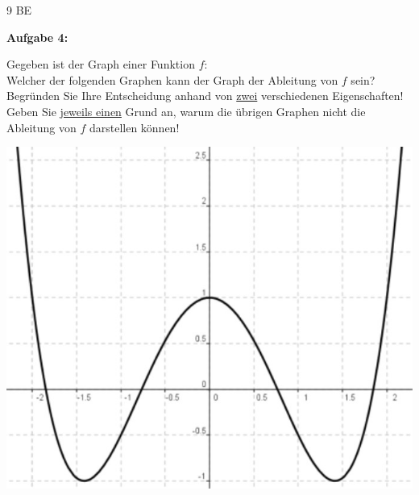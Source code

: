 \documentclass[a4paper,12pt]{article}
\newcommand{\Aufgabe}[1]{
  {
  \vspace*{0.5cm}
  \textsf{\textbf{Aufgabe #1}}
  \vspace*{0.2cm}
  
  }
}
\begin{document}
\begin{flushright}9 BE \end{flushright}

\Aufgabe{4:}

\begin{minipage}{0.5\linewidth}
Gegeben ist der Graph einer Funktion $f$:\\

Welcher der folgenden Graphen kann der Graph der Ableitung von $f$ sein?\\

Begründen Sie Ihre Entscheidung anhand von \underline{zwei} verschiedenen Eigenschaften!\\

Geben Sie \underline{jeweils einen} Grund an, warum die übrigen Graphen nicht die Ableitung von $f$ darstellen können!

\end{minipage}\hfil
\begin{minipage}{0.5\linewidth}
    \includegraphics[width=0.8\linewidth]{Q11_210111_4.jpg}
\end{minipage}


\end{document}
